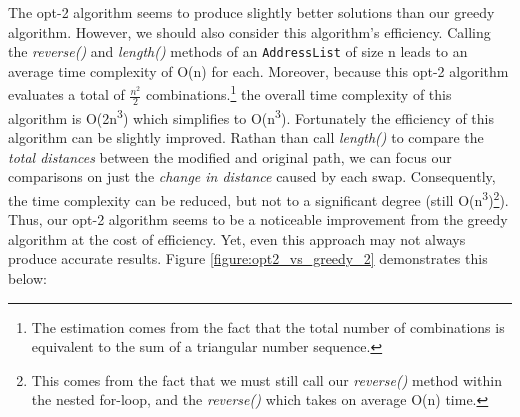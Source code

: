 \documentclass[letterpaper]{article}
\begin{document}
\begin{figure}[h]
\begin{minipage}{0.3\linewidth}
        \end{minipage}
    \end{figure}
    

    The opt-2 algorithm seems to produce slightly better solutions than our 
    greedy algorithm. However, we should also consider this algorithm's 
    efficiency. Calling the \emph{reverse()} and \emph{length()} methods of an 
    \verb|AddressList| of size n leads to an average time complexity of O(n)
    for each. Moreover, because this opt-2 algorithm evaluates a total of 
    \(\frac{n^2}{2}\) combinations.\footnote{The estimation comes from 
    the fact that the total number of combinations is equivalent to the 
    sum of a triangular number sequence.} the overall time complexity of 
    this algorithm is O(2n\textsuperscript3)  which simplifies to 
    O(n\textsuperscript3). Fortunately the efficiency of this algorithm 
    can be slightly improved. Rathan than call \emph{length()} to compare the \emph{total distances} between the 
    modified and original path, we can focus our comparisons on just the 
    \emph{change in distance} caused by each swap.
    Consequently, the time complexity can be reduced, but not to a significant degree (still O(n\textsuperscript3)\footnote{ This comes from the fact that we must still call our \emph{reverse()} method within the nested for-loop, and the \emph{reverse()} which takes on average O(n) time.}). Thus, our opt-2 algorithm seems to be a noticeable 
    improvement from the greedy algorithm at the cost of efficiency. Yet, even this 
    approach may not always produce accurate results. Figure \ref*{figure:opt2_vs_greedy_2} demonstrates this below:
    
\end{document}
